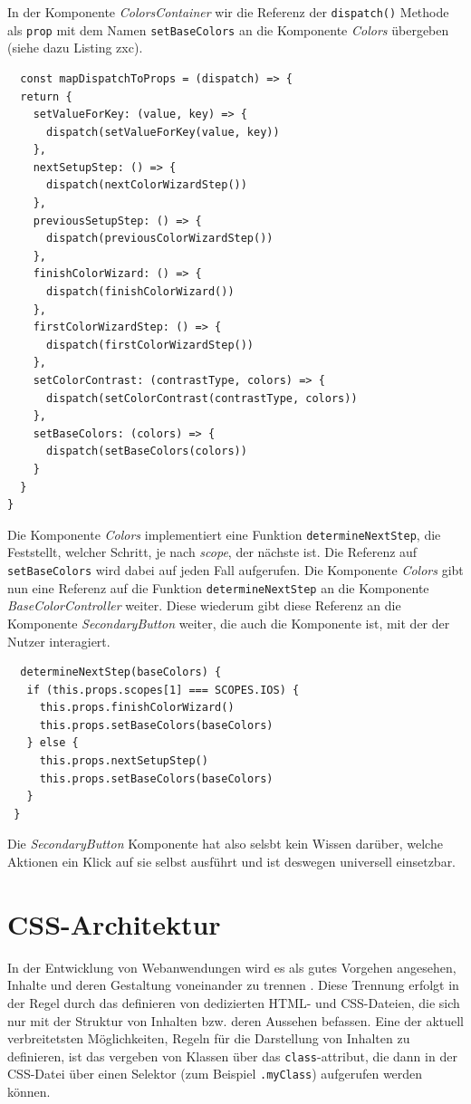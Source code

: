 In der Komponente \textit{ColorsContainer} wir die Referenz der \verb|dispatch()| Methode als \verb|prop| mit dem Namen \verb|setBaseColors| an die Komponente \textit{Colors} übergeben (siehe dazu Listing zxc).

\begin{lstlisting}
  const mapDispatchToProps = (dispatch) => {
  return {
    setValueForKey: (value, key) => {
      dispatch(setValueForKey(value, key))
    },
    nextSetupStep: () => {
      dispatch(nextColorWizardStep())
    },
    previousSetupStep: () => {
      dispatch(previousColorWizardStep())
    },
    finishColorWizard: () => {
      dispatch(finishColorWizard())
    },
    firstColorWizardStep: () => {
      dispatch(firstColorWizardStep())
    },
    setColorContrast: (contrastType, colors) => {
      dispatch(setColorContrast(contrastType, colors))
    },
    setBaseColors: (colors) => {
      dispatch(setBaseColors(colors))
    }
  }
}
\end{lstlisting}

Die Komponente \textit{Colors} implementiert eine Funktion \verb|determineNextStep|, die Feststellt, welcher Schritt, je nach \textit{scope}, der nächste ist. Die Referenz auf \verb|setBaseColors| wird dabei auf jeden Fall aufgerufen. Die Komponente \textit{Colors} gibt nun eine Referenz auf die Funktion \verb|determineNextStep| an die Komponente \textit{BaseColorController} weiter. Diese wiederum gibt diese Referenz an die Komponente \textit{SecondaryButton} weiter, die auch die Komponente ist, mit der der Nutzer interagiert.

\begin{lstlisting}
  determineNextStep(baseColors) {
   if (this.props.scopes[1] === SCOPES.IOS) {
     this.props.finishColorWizard()
     this.props.setBaseColors(baseColors)
   } else {
     this.props.nextSetupStep()
     this.props.setBaseColors(baseColors)
   }
 }
\end{lstlisting}

Die \textit{SecondaryButton} Komponente hat also selsbt kein Wissen darüber, welche Aktionen ein Klick auf sie selbst ausführt und ist deswegen universell einsetzbar.


\section{CSS-Architektur}
In der Entwicklung von Webanwendungen wird es als gutes Vorgehen angesehen, Inhalte und deren Gestaltung voneinander zu trennen \cite[S. 56]{goodman2002dynamic}. Diese Trennung erfolgt in der Regel durch das definieren von dedizierten HTML- und CSS-Dateien, die sich nur mit der Struktur von Inhalten bzw. deren Aussehen befassen. 
Eine der aktuell verbreitetsten Möglichkeiten, Regeln für die Darstellung von Inhalten zu definieren, ist das vergeben von Klassen über das \verb|class|-attribut, die dann in der CSS-Datei über einen Selektor (zum Beispiel \verb|.myClass|) aufgerufen werden können.

